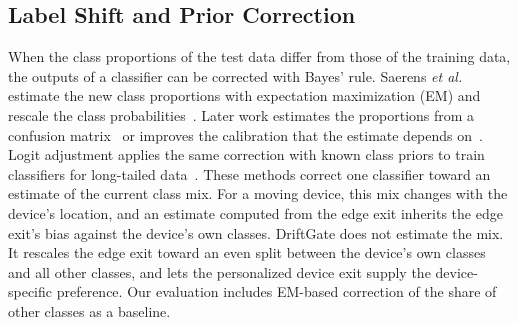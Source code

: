 \subsection{Label Shift and Prior Correction}

When the class proportions of the test data differ from those of the training data, the outputs of a classifier can be corrected with Bayes' rule. Saerens \emph{et al.} estimate the new class proportions with expectation maximization (EM) and rescale the class probabilities~\cite{saerens2002adjusting}. Later work estimates the proportions from a confusion matrix~\cite{lipton2018bbse} or improves the calibration that the estimate depends on~\cite{alexandari2020mlls}. Logit adjustment applies the same correction with known class priors to train classifiers for long-tailed data~\cite{menon2021logit}. These methods correct one classifier toward an estimate of the current class mix. For a moving device, this mix changes with the device's location, and an estimate computed from the edge exit inherits the edge exit's bias against the device's own classes. DriftGate does not estimate the mix. It rescales the edge exit toward an even split between the device's own classes and all other classes, and lets the personalized device exit supply the device-specific preference. Our evaluation includes EM-based correction of the share of other classes as a baseline.

